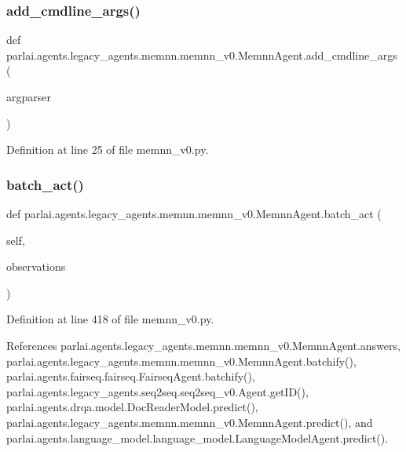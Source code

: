 \subsubsection{\texorpdfstring{add\+\_\+cmdline\+\_\+args()}{add\_cmdline\_args()}}
{\footnotesize\ttfamily def parlai.\+agents.\+legacy\+\_\+agents.\+memnn.\+memnn\+\_\+v0.\+Memnn\+Agent.\+add\+\_\+cmdline\+\_\+args (\begin{DoxyParamCaption}\item[{}]{argparser }\end{DoxyParamCaption})\hspace{0.3cm}{\ttfamily [static]}}



Definition at line 25 of file memnn\+\_\+v0.\+py.

\mbox{\label{classparlai_1_1agents_1_1legacy__agents_1_1memnn_1_1memnn__v0_1_1MemnnAgent_ad73ed6e730b608491c2d8ef3ad25e32a}} 
\subsubsection{\texorpdfstring{batch\+\_\+act()}{batch\_act()}}
{\footnotesize\ttfamily def parlai.\+agents.\+legacy\+\_\+agents.\+memnn.\+memnn\+\_\+v0.\+Memnn\+Agent.\+batch\+\_\+act (\begin{DoxyParamCaption}\item[{}]{self,  }\item[{}]{observations }\end{DoxyParamCaption})}



Definition at line 418 of file memnn\+\_\+v0.\+py.



References parlai.\+agents.\+legacy\+\_\+agents.\+memnn.\+memnn\+\_\+v0.\+Memnn\+Agent.\+answers, parlai.\+agents.\+legacy\+\_\+agents.\+memnn.\+memnn\+\_\+v0.\+Memnn\+Agent.\+batchify(), parlai.\+agents.\+fairseq.\+fairseq.\+Fairseq\+Agent.\+batchify(), parlai.\+agents.\+legacy\+\_\+agents.\+seq2seq.\+seq2seq\+\_\+v0.\+Agent.\+get\+I\+D(), parlai.\+agents.\+drqa.\+model.\+Doc\+Reader\+Model.\+predict(), parlai.\+agents.\+legacy\+\_\+agents.\+memnn.\+memnn\+\_\+v0.\+Memnn\+Agent.\+predict(), and parlai.\+agents.\+language\+\_\+model.\+language\+\_\+model.\+Language\+Model\+Agent.\+predict().



